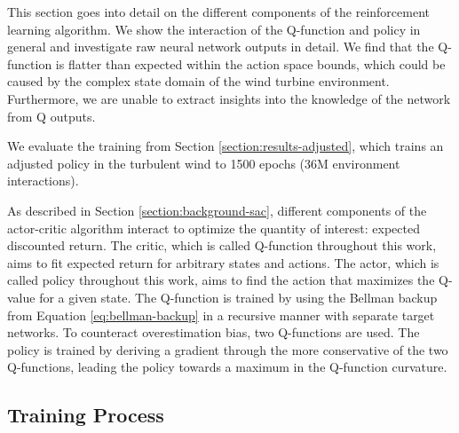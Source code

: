 \begin{summary}
This section goes into detail on the different components of the reinforcement learning algorithm. We show the interaction of the Q-function and policy in general and investigate raw neural network outputs in detail. We find that the Q-function is flatter than expected within the action space bounds, which could be caused by the complex state domain of the wind turbine environment. Furthermore, we are unable to extract insights into the knowledge of the network from Q outputs. 
\end{summary}

We evaluate the training from Section \ref{section:results-adjusted}, which trains an adjusted policy in the turbulent wind to 1500 epochs (36M environment interactions).

As described in Section \ref{section:background-sac}, different components of the actor-critic algorithm interact to optimize the quantity of interest: expected discounted return. The critic, which is called Q-function throughout this work, aims to fit expected return for arbitrary states and actions. The actor, which is called policy throughout this work, aims to find the action that maximizes the Q-value for a given state. The Q-function is trained by using the Bellman backup from Equation \ref{eq:bellman-backup} in a recursive manner with separate target networks. To counteract overestimation bias, two Q-functions are used. The policy is trained by deriving a gradient through the more conservative of the two Q-functions, leading the policy towards a maximum in the Q-function curvature.

\subsection{Training Process}

